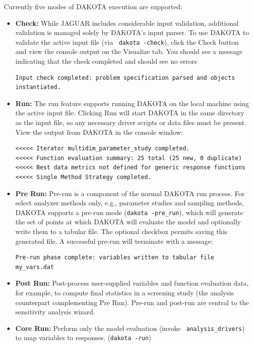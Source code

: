 Currently five modes of DAKOTA execution are supported:
\begin{itemize}

\item {\bf Check:} While JAGUAR includes considerable input
validation, additional validation is managed solely by DAKOTA's input
parser.  To use DAKOTA to validate the active input file (via {\tt
dakota -check}), click the Check button and view the console output on
the Visualize tab.  You should see a message indicating that the check
completed and should see no errors
\begin{small}
\begin{verbatim}
Input check completed: problem specification parsed and objects instantiated.
\end{verbatim}
\end{small}

\item {\bf Run:} The run feature supports running DAKOTA on the local
machine using the active input file.  Clicking Run will start DAKOTA
in the same directory as the input file, so any necessary driver
scripts or data files must be present.  View the output from DAKOTA in
the console window:

\begin{verbatim}
<<<<< Iterator multidim_parameter_study completed.
<<<<< Function evaluation summary: 25 total (25 new, 0 duplicate)
<<<<< Best data metrics not defined for generic response functions
<<<<< Single Method Strategy completed.
\end{verbatim}

\item {\bf Pre Run:} Pre-run is a component of the normal DAKOTA run
process.  For select analyzer methods only, e.g., parameter studies
and sampling methods, DAKOTA supports a pre-run mode ({\tt dakota
-pre\_run}), which will generate the set of points at which DAKOTA
will evaluate the model and optionally write them to a tabular file.
The optional checkbox permits saving this generated file.  A
successful pre-run will terminate with a message:

\begin{small}
\begin{verbatim}
Pre-run phase complete: variables written to tabular file my_vars.dat
\end{verbatim}
\end{small}

\item {\bf Post Run:} Post-process user-supplied variables and
function evaluation data, for example, to compute final statistics in
a screening study (the analysis counterpart complementing Pre Run).
Pre-run and post-run are central to the sensitivity analysis wizard.

\item {\bf Core Run:} Perform only the model evaluation (invoke {\tt
analysis\_drivers}) to map variables to responses.  ({\tt dakota
-run})

\end{itemize}


